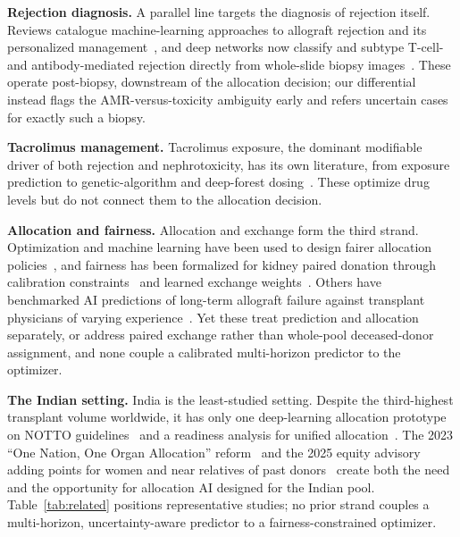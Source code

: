 \documentclass[journal]{IEEEtran}
\begin{document}
\textbf{Rejection diagnosis.} A parallel line targets the diagnosis of rejection itself. Reviews catalogue machine-learning approaches to allograft rejection and its personalized management~\cite{belcic,almoussawy}, and deep networks now classify and subtype T-cell- and antibody-mediated rejection directly from whole-slide biopsy images~\cite{wsi}. These operate post-biopsy, downstream of the allocation decision; our differential instead flags the AMR-versus-toxicity ambiguity early and refers uncertain cases for exactly such a biopsy.

\textbf{Tacrolimus management.} Tacrolimus exposure, the dominant modifiable driver of both rejection and nephrotoxicity, has its own literature, from exposure prediction to genetic-algorithm and deep-forest dosing~\cite{tacro}. These optimize drug levels but do not connect them to the allocation decision.

\textbf{Allocation and fairness.} Allocation and exchange form the third strand. Optimization and machine learning have been used to design fairer allocation policies~\cite{bert}, and fairness has been formalized for kidney paired donation through calibration constraints~\cite{zhang} and learned exchange weights~\cite{carvalho}. Others have benchmarked AI predictions of long-term allograft failure against transplant physicians of varying experience~\cite{divard}. Yet these treat prediction and allocation separately, or address paired exchange rather than whole-pool deceased-donor assignment, and none couple a calibrated multi-horizon predictor to the optimizer.

\textbf{The Indian setting.} India is the least-studied setting. Despite the third-highest transplant volume worldwide, it has only one deep-learning allocation prototype on NOTTO guidelines~\cite{reva} and a readiness analysis for unified allocation~\cite{oneindia}. The 2023 ``One Nation, One Organ Allocation'' reform~\cite{notto} and the 2025 equity advisory adding points for women and near relatives of past donors~\cite{nottoadv} create both the need and the opportunity for allocation AI designed for the Indian pool. Table~\ref{tab:related} positions representative studies; no prior strand couples a multi-horizon, uncertainty-aware predictor to a fairness-constrained optimizer.
\end{document}
